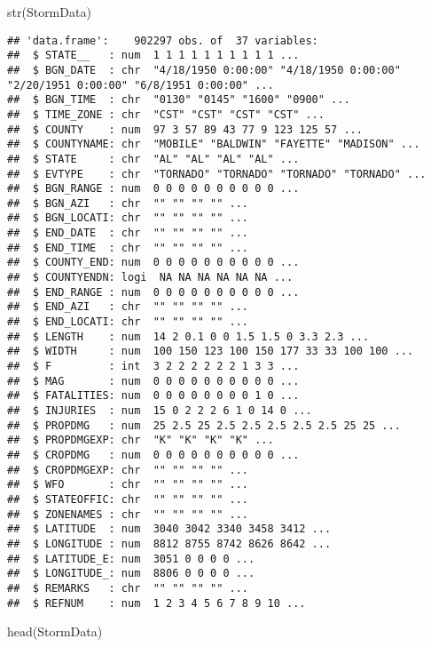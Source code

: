 \documentclass[
]{article}
\newenvironment{Shaded}{\begin{snugshade}}{\end{snugshade}}
\newcommand{\FunctionTok}[1]{\textcolor[rgb]{0.00,0.00,0.00}{#1}}
\newcommand{\NormalTok}[1]{#1}
\begin{document}
\begin{Shaded}
\begin{Highlighting}[]
\FunctionTok{str}\NormalTok{(StormData)}
\end{Highlighting}
\end{Shaded}

\begin{verbatim}
## 'data.frame':    902297 obs. of  37 variables:
##  $ STATE__   : num  1 1 1 1 1 1 1 1 1 1 ...
##  $ BGN_DATE  : chr  "4/18/1950 0:00:00" "4/18/1950 0:00:00" "2/20/1951 0:00:00" "6/8/1951 0:00:00" ...
##  $ BGN_TIME  : chr  "0130" "0145" "1600" "0900" ...
##  $ TIME_ZONE : chr  "CST" "CST" "CST" "CST" ...
##  $ COUNTY    : num  97 3 57 89 43 77 9 123 125 57 ...
##  $ COUNTYNAME: chr  "MOBILE" "BALDWIN" "FAYETTE" "MADISON" ...
##  $ STATE     : chr  "AL" "AL" "AL" "AL" ...
##  $ EVTYPE    : chr  "TORNADO" "TORNADO" "TORNADO" "TORNADO" ...
##  $ BGN_RANGE : num  0 0 0 0 0 0 0 0 0 0 ...
##  $ BGN_AZI   : chr  "" "" "" "" ...
##  $ BGN_LOCATI: chr  "" "" "" "" ...
##  $ END_DATE  : chr  "" "" "" "" ...
##  $ END_TIME  : chr  "" "" "" "" ...
##  $ COUNTY_END: num  0 0 0 0 0 0 0 0 0 0 ...
##  $ COUNTYENDN: logi  NA NA NA NA NA NA ...
##  $ END_RANGE : num  0 0 0 0 0 0 0 0 0 0 ...
##  $ END_AZI   : chr  "" "" "" "" ...
##  $ END_LOCATI: chr  "" "" "" "" ...
##  $ LENGTH    : num  14 2 0.1 0 0 1.5 1.5 0 3.3 2.3 ...
##  $ WIDTH     : num  100 150 123 100 150 177 33 33 100 100 ...
##  $ F         : int  3 2 2 2 2 2 2 1 3 3 ...
##  $ MAG       : num  0 0 0 0 0 0 0 0 0 0 ...
##  $ FATALITIES: num  0 0 0 0 0 0 0 0 1 0 ...
##  $ INJURIES  : num  15 0 2 2 2 6 1 0 14 0 ...
##  $ PROPDMG   : num  25 2.5 25 2.5 2.5 2.5 2.5 2.5 25 25 ...
##  $ PROPDMGEXP: chr  "K" "K" "K" "K" ...
##  $ CROPDMG   : num  0 0 0 0 0 0 0 0 0 0 ...
##  $ CROPDMGEXP: chr  "" "" "" "" ...
##  $ WFO       : chr  "" "" "" "" ...
##  $ STATEOFFIC: chr  "" "" "" "" ...
##  $ ZONENAMES : chr  "" "" "" "" ...
##  $ LATITUDE  : num  3040 3042 3340 3458 3412 ...
##  $ LONGITUDE : num  8812 8755 8742 8626 8642 ...
##  $ LATITUDE_E: num  3051 0 0 0 0 ...
##  $ LONGITUDE_: num  8806 0 0 0 0 ...
##  $ REMARKS   : chr  "" "" "" "" ...
##  $ REFNUM    : num  1 2 3 4 5 6 7 8 9 10 ...
\end{verbatim}

\begin{Shaded}
\begin{Highlighting}[]
\FunctionTok{head}\NormalTok{(StormData)}
\end{Highlighting}
\end{Shaded}
\end{document}
